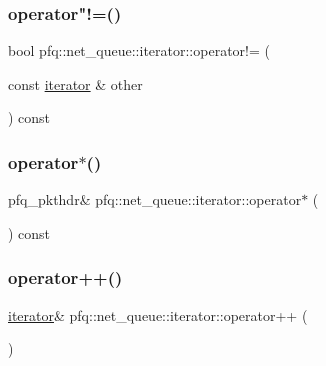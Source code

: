 \subsubsection{\texorpdfstring{operator"!=()}{operator!=()}}
{\footnotesize\ttfamily bool pfq\+::net\+\_\+queue\+::iterator\+::operator!= (\begin{DoxyParamCaption}\item[{const \hyperlink{structpfq_1_1net__queue_1_1iterator}{iterator} \&}]{other }\end{DoxyParamCaption}) const\hspace{0.3cm}{\ttfamily [inline]}}

\mbox{\label{structpfq_1_1net__queue_1_1iterator_a8a684d858626d103487a73deb527ce10}} 
\subsubsection{\texorpdfstring{operator$\ast$()}{operator*()}}
{\footnotesize\ttfamily pfq\+\_\+pkthdr\& pfq\+::net\+\_\+queue\+::iterator\+::operator$\ast$ (\begin{DoxyParamCaption}{ }\end{DoxyParamCaption}) const\hspace{0.3cm}{\ttfamily [inline]}}

\mbox{\label{structpfq_1_1net__queue_1_1iterator_a4e7bf9ea9183af5efd3ade9a50e3350c}} 
\subsubsection{\texorpdfstring{operator++()}{operator++()}\hspace{0.1cm}{\footnotesize\ttfamily [1/2]}}
{\footnotesize\ttfamily \hyperlink{structpfq_1_1net__queue_1_1iterator}{iterator}\& pfq\+::net\+\_\+queue\+::iterator\+::operator++ (\begin{DoxyParamCaption}{ }\end{DoxyParamCaption})\hspace{0.3cm}{\ttfamily [inline]}}

